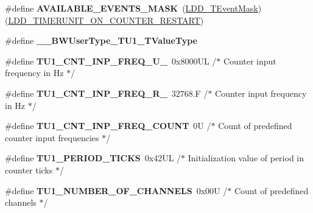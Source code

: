 \begin{DoxyCompactItemize}
\item 
\mbox{\label{group___t_u1__module_ga5f04a8830cd52a3ffa1678d113f31aee}} 
\#define {\bfseries A\+V\+A\+I\+L\+A\+B\+L\+E\+\_\+\+E\+V\+E\+N\+T\+S\+\_\+\+M\+A\+SK}~(\hyperlink{group___p_e___types__module_gafbe7f4d4e51560399c3bdd0218584533}{L\+D\+D\+\_\+\+T\+Event\+Mask})(\hyperlink{group___p_e___types__module_gae8e6bf9d76916611a08b76f20ceb1ef7}{L\+D\+D\+\_\+\+T\+I\+M\+E\+R\+U\+N\+I\+T\+\_\+\+O\+N\+\_\+\+C\+O\+U\+N\+T\+E\+R\+\_\+\+R\+E\+S\+T\+A\+RT})
\item 
\mbox{\label{group___t_u1__module_gaf0b58bf613a080724fc73a1d8b13ff39}} 
\#define {\bfseries \+\_\+\+\_\+\+B\+W\+User\+Type\+\_\+\+T\+U1\+\_\+\+T\+Value\+Type}
\item 
\mbox{\label{group___t_u1__module_ga85cc4897457440a2308166668f49da10}} 
\#define {\bfseries T\+U1\+\_\+\+C\+N\+T\+\_\+\+I\+N\+P\+\_\+\+F\+R\+E\+Q\+\_\+\+U\+\_}~0x8000\+U\+L  /$\ast$ Counter input frequency in Hz $\ast$/
\item 
\mbox{\label{group___t_u1__module_ga4913c95039859613c2db9d00795ab5d6}} 
\#define {\bfseries T\+U1\+\_\+\+C\+N\+T\+\_\+\+I\+N\+P\+\_\+\+F\+R\+E\+Q\+\_\+\+R\+\_}~32768.\+F /$\ast$ Counter input frequency in Hz $\ast$/
\item 
\mbox{\label{group___t_u1__module_ga855f7e71146b18903d56643ec80c5ddb}} 
\#define {\bfseries T\+U1\+\_\+\+C\+N\+T\+\_\+\+I\+N\+P\+\_\+\+F\+R\+E\+Q\+\_\+\+C\+O\+U\+NT}~0\+U      /$\ast$ Count of predefined counter input frequencies $\ast$/
\item 
\mbox{\label{group___t_u1__module_ga17e6ec4b6bb1df9067daf9ac4204db66}} 
\#define {\bfseries T\+U1\+\_\+\+P\+E\+R\+I\+O\+D\+\_\+\+T\+I\+C\+KS}~0x42\+U\+L      /$\ast$ Initialization value of period in \textquotesingle{}counter ticks\textquotesingle{} $\ast$/
\item 
\mbox{\label{group___t_u1__module_ga15dbabf955f2e2b0f888b98320eabfa3}} 
\#define {\bfseries T\+U1\+\_\+\+N\+U\+M\+B\+E\+R\+\_\+\+O\+F\+\_\+\+C\+H\+A\+N\+N\+E\+LS}~0x00\+U   /$\ast$ Count of predefined channels $\ast$/

\end{DoxyCompactItemize}

